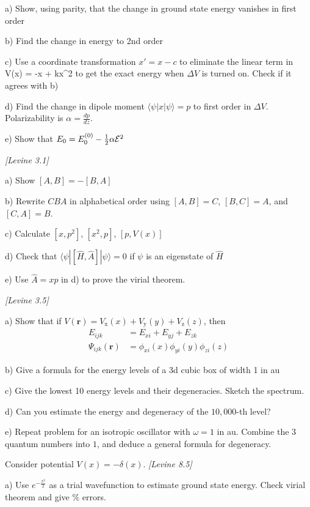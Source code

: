 a) Show, using parity, that the change in ground state energy vanishes in first order

b) Find the change in energy to 2nd order

c) Use a coordinate transformation $x' = x - c$ to eliminate the linear term in
\be
   V(x) = -\cE x + kx^2
\ee
to get the exact energy when $\Delta V$ is turned on. Check if it agrees with b)

d) Find the change in dipole moment $\langle\psi|x|\psi\rangle = p$ to first order in
$\Delta V$. Polarizability is $\alpha = \frac{dp}{dz}$.

e) Show that $E_0 = E_0^{(0)} - \frac{1}{2}\alpha {\cal E}^2$

\newpage
{}
{\em [Levine 3.1]}

a) Show $[A,B] = -[B,A]$

b) Rewrite $CBA$ in alphabetical order using $[A,B] = C$, $[B,C]=A$, and $[C,A]=B$.

c) Calculate $[x,p^2]$, $[x^2,p]$, $[p,V(x)]$

d) Check that $\langle\psi|[\hat{H},\hat{A}]|\psi\rangle = 0$ if
$\psi$ is an eigenstate of $\hat{H}$

e) Use $\hat{A} = xp$ in d) to prove the virial theorem.

\newpage
{}
{\em [Levine 3.5]}

a) Show that if $V(\mathbf{r}) = V_{\text{x}}(x) + V_{\text{y}}(y) + V_{\text{z}}(z)$, then
\begin{align*}
   E_{ijk} & = E_{xi} + E_{yj} + E_{zk} \\
   \Psi_{ijk}(\mathbf{r}) & = \phi_{xi}(x)\phi_{yi}(y)\phi_{zi}(z)
\end{align*}  

b) Give a formula for the energy levels of a 3d cubic box of width 1 in au

c) Give the lowest 10 energy levels and their degeneracies. Sketch the spectrum.

d) Can you estimate the energy and degeneracy of the $10,000$-th level?

e) Repeat problem for an isotropic oscillator with $\omega=1$ in au. Combine the $3$
quantum numbers into $1$, and deduce a general formula for degeneracy.

\newpage
{}
Consider potential $V(x) = -\delta(x)$.
{\em [Levine 8.5]}

a) Use $e^{-\frac{x^2}{2}}$ as a trial wavefunction to estimate ground state energy.
Check virial theorem and give $\%$ errors.


